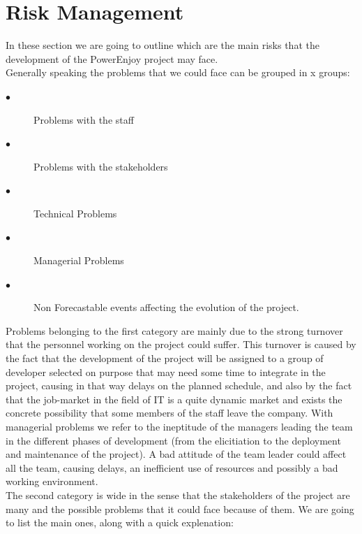 \documentclass[a4paper,10pt]{article}
\begin{document}
  \clearpage\section{Risk Management}
  In these section we are going to outline which are the main risks that the development of the PowerEnjoy project may face.
  \\Generally speaking the problems that we could face can be grouped in x groups:
   \begin{description}
    \item[$\bullet$] Problems with the staff
    \item[$\bullet$] Problems with the stakeholders
    \item[$\bullet$] Technical Problems
    \item[$\bullet$] Managerial Problems
    \item[$\bullet$] Non Forecastable events affecting the evolution of the project.
  \end{description}
  Problems belonging to the first category are mainly due to the strong turnover that the personnel working on the project could suffer.
  This turnover is caused by the fact that the development of the project will be assigned to a group of developer selected on purpose that 
 may need some time to integrate in the project, causing in that way delays on the planned schedule, and also by the fact that the job-market
 in the field of IT is a quite dynamic market and exists the concrete possibility that some members of the staff leave the company.
 With managerial problems we refer to the ineptitude of the managers leading the team in the different phases of development (from the 
  elicitiation to the deployment and maintenance of the project). A bad attitude of the team leader could affect all the team, causing delays,
  an inefficient use of resources and possibly a bad working environment.\\
 The second category is wide in the sense that the stakeholders of the project are many and the possible problems that it could face because of 
 them. We are going to list the main ones, along with a quick explenation:
\end{document}
